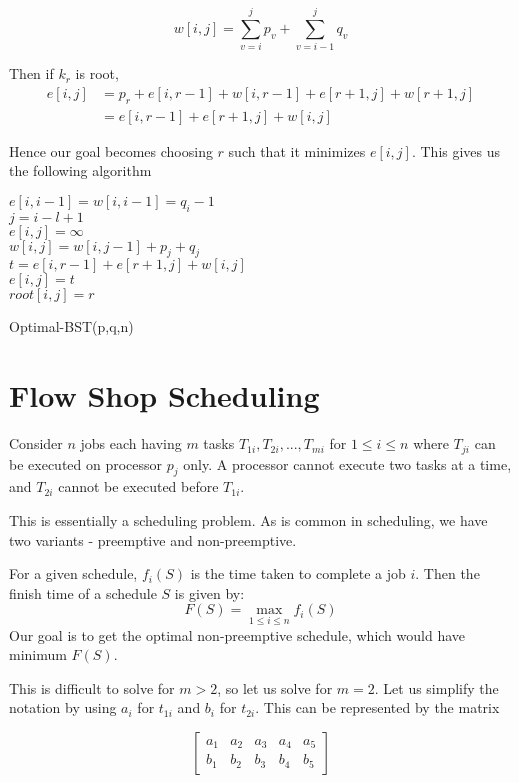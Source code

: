 \documentclass[12pt,letterpaper]{article}
\theoremstyle{definition}
\begin{document}
\[w[i,j] = \sum_{v=i}^j p_v + \sum_{v=i-1}^j q_v\]

Then if $k_r$ is root,
\begin{align*}
  e[i,j] &=  p_r + e[i,r-1] + w[i,r-1] + e[r+1,j] + w[r+1,j] \\
         &= e[i,r-1] + e[r+1,j] + w[i,j]
\end{align*}

Hence our goal becomes choosing $r$ such that it minimizes $e[i,j]$. This gives us the following algorithm

\begin{algorithm}[H]
  \SetAlgoLined
   {
    $e[i,i-1] = w[i,i-1] = q_i-1$ \\
  }
   {
     {
      $j = i-l+1$ \\
      $e[i,j] = \infty$ \\ 
      $w[i,j] = w[i,j-1] + p_j + q_j$ \\
       {
        $t = e[i,r-1] + e[r+1,j] + w[i,j]$ \\
         {
          $e[i,j] = t$ \\
          $root[i,j] = r$
        }
      }
    }
  }
  \caption{Optimal-BST(p,q,n)}
\end{algorithm}

\section{Flow Shop Scheduling}

Consider $n$ jobs each having $m$ tasks $T_{1i}, T_{2i}, ... , T_{mi}$ for $1 \leq i \leq n$ where $T_{ji}$ can be executed on processor $p_j$ only. A processor cannot execute two tasks at a time, and $T_{2i}$ cannot be executed before $T_{1i}$.

This is essentially a scheduling problem. As is common in scheduling, we have two variants - preemptive and non-preemptive.

For a given schedule, $f_i(S)$ is the time taken to complete a job $i$. Then the finish time of a schedule $S$ is given by:
\[F(S) = \max_{1 \leq i \leq n} f_i(S)\]
Our goal is to get the optimal non-preemptive schedule, which would have minimum $F(S)$.

This is difficult to solve for $m > 2$, so let us solve for $m=2$. Let us simplify the notation by using $a_i$ for $t_{1i}$ and $b_i$ for $t_{2i}$. This can be represented by the matrix

\[\begin{bmatrix}
  a_1 & a_2 & a_3 & a_4 & a_5 \\
  b_1 & b_2 & b_3 & b_4 & b_5
\end{bmatrix}\]
\end{document}
